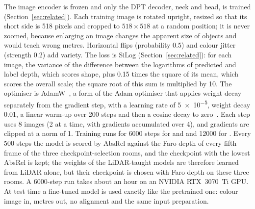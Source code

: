 The image encoder is frozen and only the DPT decoder, neck and head, is trained (Section~\ref{sec:related}). Each
training image is rotated upright, resized so that its short side is 518 pixels and cropped to $518\times518$ at a
random position; it is never zoomed, because enlarging an image changes the apparent size of objects and would teach
wrong metres. Horizontal flips (probability 0.5) and colour jitter (strength 0.2) add variety. The loss is SiLog
(Section~\ref{sec:related}): for each image, the variance of the difference between the logarithms of predicted and
label depth, which scores shape, plus 0.15 times the square of its mean, which scores the overall scale; the square
root of this sum is multiplied by 10. The optimiser is AdamW~\cite{adamw}, a form of the Adam optimiser that applies
weight decay separately from the gradient step, with a learning rate of \num{5e-5}, weight decay 0.01, a linear
warm-up over 200 steps and then a cosine decay to zero~\cite{sgdr}. Each step uses 8 images (2 at a time, with
gradients accumulated over 4), and gradients are clipped at a norm of 1. Training runs for \num{6000} steps for
\ftfaro{} and \ftlidar{} and \num{12000} for \ftmain{}. Every 500 steps the model is scored by AbsRel against the Faro
depth of every fifth frame of the three checkpoint-selection rooms, and the checkpoint with the lowest AbsRel is kept;
the weights of the LiDAR-taught models are therefore learned from LiDAR alone, but their checkpoint is chosen with Faro
depth on these three rooms. A \num{6000}-step run takes about an hour on an NVIDIA RTX~3070~Ti GPU. At test time a
fine-tuned model is used exactly like the pretrained one: colour image in, metres out, no alignment and the same input
preparation.

